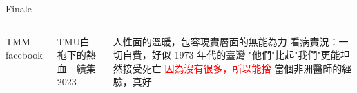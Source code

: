 \documentclass[aspectratio=169]{beamer}
\begin{document}
\begin{frame}{Finale}
\begin{columns}
    
TMM facebook

TMU白袍下的熱血---續集2023
\begin{outline}


    \1 人性面的溫暖，包容現實層面的無能為力
        \2 看病實況：一切自費，好似 1973 年代的臺灣
        \2 "他們"比起"我們"更能坦然接受死亡
        \2 \textcolor{red}{因為沒有很多，所以能捨}
    \1 當個非洲醫師的經驗，真好

\end{outline}


\end{columns}
\end{frame}


\end{document}
